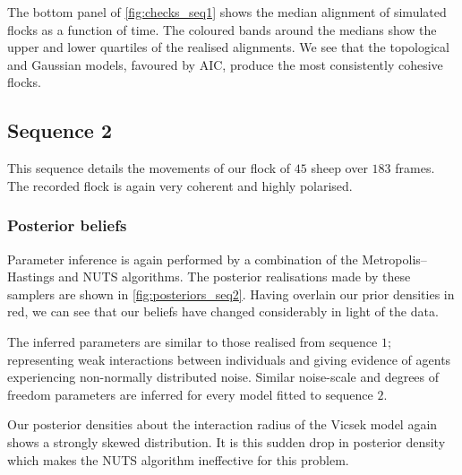 The bottom panel of \cref{fig:checks_seq1} shows the median alignment of
simulated flocks as a function of time. The coloured bands around the medians
show the upper and lower quartiles of the realised alignments. We see that the
topological and Gaussian models, favoured by AIC, produce the most consistently
cohesive flocks.

\subsection{Sequence 2}

This sequence details the movements of our flock of $45$ sheep over $183$
frames. The recorded flock is again very coherent and highly polarised. 

\subsubsection{Posterior beliefs}

Parameter inference is again performed by a combination of the Metropolis--Hastings
and NUTS algorithms. The posterior realisations made by these samplers are shown
in \cref{fig:posteriors_seq2}. Having overlain our prior densities in red,
we can see that our beliefs have changed considerably in light of the data.

The inferred parameters are similar to those realised from sequence $1$;
representing weak interactions between individuals and giving evidence of
agents experiencing non-normally distributed noise. Similar noise-scale and
degrees of freedom parameters are inferred for every model fitted to sequence
$2$.

Our posterior densities about the interaction radius of the Vicsek model again
shows a strongly skewed distribution. It is this sudden drop in posterior
density which makes the NUTS algorithm ineffective for this problem.

